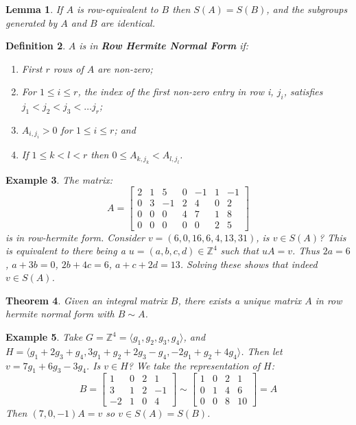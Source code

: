\documentclass[a4paper,10pt]{article}
\newcommand{\ZZ}{\mathbb{Z}}
\newtheorem{thm}{Theorem}
\newtheorem{Def}[thm]{Definition}
\newtheorem{eg}[thm]{Example}
\newtheorem{Lem}[thm]{Lemma}
\begin{document}
\begin{Lem}
If $A$ is row-equivalent to $B$ then $S(A) = S(B)$, and the subgroups generated by $A$ and $B$ are identical.
\end{Lem}

\begin{Def}
$A$ is in \textbf{Row Hermite Normal Form} if:
\begin{enumerate}
\item First $r$ rows of $A$ are non-zero;
\item For $1 \leq i \leq r$, the index of the first non-zero entry in row i, $j_i$, satisfies $j_1 < j_2 < j_3 < \dots j_r$;
\item $A_{i, j_i} > 0$ for $1 \leq i \leq r$; and
\item If $1 \leq k < l < r$ then $0 \leq A_{k,j_k} < A_{l,j_l}$.
\end{enumerate}
\end{Def}

\begin{eg}
The matrix:
\[ A = \begin{bmatrix} 2 & 1 & 5 & 0 & -1 & 1 & -1 \\
                       0 & 3 & -1 & 2 & 4 & 0 & 2 \\
                       0 & 0 & 0 & 4 & 7 & 1 & 8 \\
                       0 & 0 & 0 & 0 & 0 & 2 & 5 
 \end{bmatrix} \]
is in row-hermite form. Consider $v = (6,0,16,6,4,13,31)$, is $v \in S(A)$? This is equivalent to there being a $u = (a,b,c,d) \in \ZZ^4$ such that $uA = v$. Thus $2a = 6$, $a + 3b = 0$, $2b + 4c = 6$, $a + c + 2d = 13$. Solving these shows that indeed $v \in S(A)$.
\end{eg}

\begin{thm}
Given an integral matrix $B$, there exists a unique matrix $A$ in row hermite normal form with $B \sim A$. 
\end{thm}

\begin{eg}
Take $G = \ZZ^4 = \langle g_1, g_2, g_3, g_4 \rangle$, and $H = \langle g_1 + 2g_3 + g_4, 3g_1 + g_2 + 2g_3 - g_4, -2g_1 + g_2 + 4g_4 \rangle$. Then let $v = 7g_1 + 6g_3 - 3g_4$. Is $v \in H$? We take the representation of $H$:
\[ B = \begin{bmatrix} 1 & 0 & 2 & 1 \\ 3 & 1 & 2 & -1 \\ -2 & 1 & 0 & 4 \end{bmatrix} \sim \begin{bmatrix} 1 & 0 & 2 & 1 \\ 0 & 1 & 4 & 6 \\ 0 & 0 & 8 & 10 \end{bmatrix} = A\]
Then $(7, 0, -1) A = v$ so $v \in S(A) = S(B)$. 
\end{eg}
\end{document}
